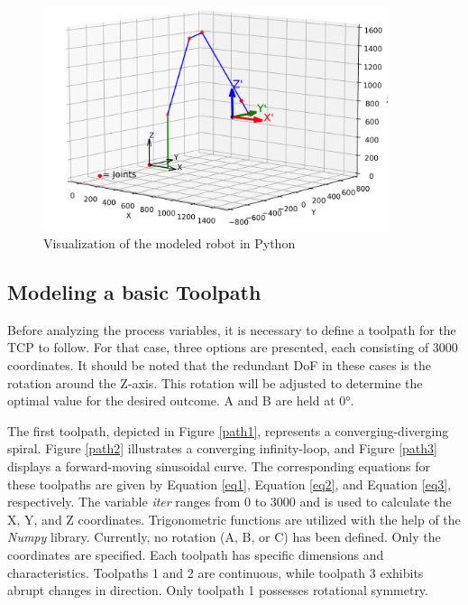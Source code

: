  \begin{figure}[H]
	\centerline{\includegraphics[width=0.9\textwidth]{figures/robotprog.png}}
	\caption{Visualization of the modeled robot in Python}
	\label{robotprog}
\end{figure}


\subsection{Modeling a basic Toolpath}\label{MBT}
Before analyzing the process variables, it is necessary to define a toolpath for the \acrshort{TCP} to follow. For that case, three options are presented, each consisting of 3000 coordinates. It should be noted that the redundant \acrshort{DoF} in these cases is the rotation around the Z-axis. This rotation will be adjusted to determine the optimal value for the desired outcome. A and B are held at 0°.

The first toolpath, depicted in Figure \ref{path1}, represents a converging-diverging spiral. Figure \ref{path2} illustrates a converging infinity-loop, and Figure \ref{path3} displays a forward-moving sinusoidal curve. The corresponding equations for these toolpaths are given by Equation \ref{eq1}, Equation \ref{eq2}, and Equation \ref{eq3}, respectively. The variable \textit{iter} ranges from 0 to 3000 and is used to calculate the X, Y, and Z coordinates. Trigonometric functions are utilized with the help of the \textit{Numpy} library. Currently, no rotation (A, B, or C) has been defined. Only the coordinates are specified. Each toolpath has specific dimensions and characteristics. Toolpaths 1 and 2 are continuous, while toolpath 3 exhibits abrupt changes in direction. Only toolpath 1 possesses rotational symmetry.\newpage


